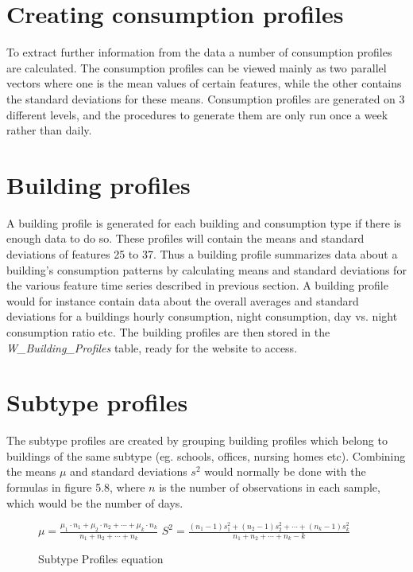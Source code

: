 \section{Creating consumption profiles}
To extract further information from the data a number of consumption profiles are calculated. The consumption profiles can be viewed mainly as two parallel vectors where one is the mean values of certain features, while the other contains the standard deviations for these means. Consumption profiles are generated on 3 different levels, and the procedures to generate them are only run once a week rather than daily. 
\section*{Building profiles}
A building profile is generated for each building and consumption type if there is enough data to do so. These profiles will contain the means and standard deviations of features 25 to 37. Thus a building profile summarizes data about a building's consumption patterns by calculating means and standard deviations for the various feature time series described in previous section. A building profile would for instance contain data about the overall averages and standard deviations for a buildings hourly consumption, night consumption, day vs. night consumption ratio etc. The building profiles are then stored in the \emph{W\_Building\_Profiles} table, ready for the website to access.
\section*{Subtype profiles}
The subtype profiles are created by grouping building profiles which belong to buildings of the same subtype (eg. schools, offices, nursing homes etc). Combining the means $\mu$ and standard deviations $s^2$ would normally be done with the formulas in figure 5.8, where $n$ is the number of observations in each sample, which would be the number of days.
\begin{figure}
\begin{center}
$\mu = \frac{\mu_1\cdot n_1+\mu_2\cdot n_2+ \cdots +\mu_k\cdot n_k}{n_1+n_2+ \cdots +n_k}$
\newline
\newline
$S^2 = \frac{(n_1-1)s_1^2+(n_2-1)s_2^2+\cdots +(n_k - 1)s_k^2}{n_1 + n_2+\cdots +n_k -k}$
\end{center}
\caption{Subtype Profiles equation}
\end{figure}


